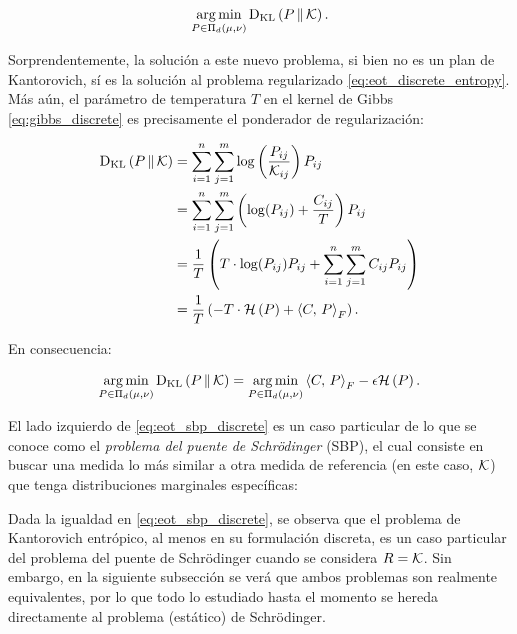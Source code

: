 \begin{equation*}
	\operatorname*{arg\,min}_{P\in\Pi_d(\mu,\nu)} \operatorname{D_{KL}}\left(P\,\|\,\mathcal{K}\right).
\end{equation*}

Sorprendentemente, la solución a este nuevo problema, si bien no es un plan de Kantorovich, sí es la solución al problema regularizado \eqref{eq:eot_discrete_entropy}. Más aún, el parámetro de temperatura $T$ en el kernel de Gibbs \eqref{eq:gibbs_discrete} es precisamente el ponderador de regularización:

\begin{align*}
	\operatorname{D_{KL}}\left(P\,\|\,\mathcal{K}\right) &= \sum_{i=1}^n\sum_{j=1}^m \log\left(\frac{P_{ij}}{\mathcal{K}_{ij}}\right) P_{ij}\\
	&= \sum_{i=1}^n\sum_{j=1}^m \left(\log(P_{ij}) + \frac{C_{ij}}{T}\right)P_{ij}\\
	&= \frac{1}{T}\left(T\cdot\log(P_{ij})P_{ij}+\sum_{i=1}^n\sum_{j=1}^m C_{ij}P_{ij}\right)\\
	&= \frac{1}{T}\left(- T\cdot\mathcal{H}\left(P\right) + \left\langle C,\,P\right\rangle_F\right).
\end{align*}

En consecuencia:

\begin{equation}
	\label{eq:eot_sbp_discrete}
	\operatorname*{arg\,min}_{P\in\Pi_d(\mu,\nu)} \operatorname{D_{KL}}\left(P\,\|\,\mathcal{K}\right)
	= \operatorname*{arg\,min}_{P\in\Pi_d(\mu,\nu)} \left\langle C,\,P\right\rangle_F - \epsilon \mathcal{H}\left(P\right).
\end{equation}

El lado izquierdo de \eqref{eq:eot_sbp_discrete} es un caso particular de lo que se conoce como el \textit{problema del puente de Schrödinger} (SBP), el cual consiste en buscar una medida lo más similar a otra medida de referencia (en este caso, $\mathcal{K}$) que tenga distribuciones marginales específicas:


Dada la igualdad en \eqref{eq:eot_sbp_discrete}, se observa que el problema de Kantorovich entrópico, al menos en su formulación discreta, es un caso particular del problema del puente de Schrödinger cuando se considera $R=\mathcal{K}$. Sin embargo, en la siguiente subsección se verá que ambos problemas son realmente equivalentes, por lo que todo lo estudiado hasta el momento se hereda directamente al problema (estático) de Schrödinger.

